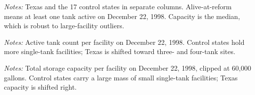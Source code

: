 \documentclass[
  12pt,
]{article}
\begin{document}
\clearpage
\null\vfill
\begin{center}
\label{tbl-summary}
\vspace{6pt}
\par\vspace{10pt}
\begin{minipage}{0.85\textwidth}\small\textit{Notes:} Texas and the 17 control states in separate columns. Alive-at-reform means at least one tank active on December 22, 1998. Capacity is the median, which is robust to large-facility outliers.\end{minipage}
\end{center}
\vfill\clearpage

\clearpage
\null\vfill
\begin{center}
\label{fig-baseline-tanks}
\par\vspace{8pt}
\par\vspace{8pt}
\begin{minipage}{0.85\textwidth}\small\textit{Notes:} Active tank count per facility on December 22, 1998. Control states hold more single-tank facilities; Texas is shifted toward three- and four-tank sites.\end{minipage}
\end{center}
\vfill\clearpage

\clearpage
\null\vfill
\begin{center}
\label{fig-baseline-capacity}
\par\vspace{8pt}
\par\vspace{8pt}
\begin{minipage}{0.85\textwidth}\small\textit{Notes:} Total storage capacity per facility on December 22, 1998, clipped at 60,000 gallons. Control states carry a large mass of small single-tank facilities; Texas capacity is shifted right.\end{minipage}
\end{center}
\vfill\clearpage
\end{document}
